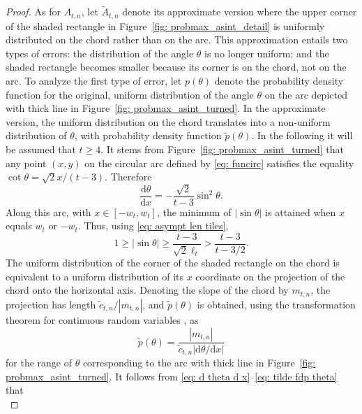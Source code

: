 \documentclass[12pt, a4paper]{article}
\newcommand{\diff}{\mathrm d}
\newcommand{\len}{\ell} %
\newcommand{\tiles}{t} %
\newcommand{\fdp}{p}
\begin{document}
\begin{proof}
As for $A_{\tiles,n}$, let $\tilde A_{\tiles,n}$ denote its approximate version where the upper corner of the shaded rectangle in Figure~\ref{fig: probmax_asint_detail} is uniformly distributed on the chord rather than on the arc. This approximation entails two types of errors: the distribution of the angle $\theta$ is no longer uniform; and the shaded rectangle becomes smaller because its corner is on the chord, not on the arc. To analyze the first type of error, let $\fdp(\theta)$ denote the probability density function for the original, uniform distribution of the angle $\theta$ on the arc depicted with thick line in Figure~\ref{fig: probmax_asint_turned}. In the approximate version, the uniform distribution on the chord translates into a non-uniform distribution of $\theta$, with probability density function $\tilde\fdp(\theta)$. In the following it will be assumed that $\tiles \geq 4$. It stems from Figure~\ref{fig: probmax_asint_turned} that any point $(x,y)$ on the circular arc defined by \eqref{eq: funcirc} satisfies the equality $\cot \theta = \sqrt{2} x /(\tiles-3)$. Therefore
\begin{equation}
\label{eq: d theta d x}
\frac{\diff \theta}{\diff x} = -\frac{\sqrt{2}}{\tiles-3} \sin^2 \theta.
\end{equation}
Along this arc, with $x \in [-w_\tiles, w_\tiles]$, the minimum of $|\sin \theta|$ is attained when $x$ equals $w_\tiles$ or $-w_\tiles$. Thus, using \eqref{eq: asympt len tiles},
\begin{equation}
\label{eq: sin theta bound}
1 \geq |\sin \theta| \geq \frac{\tiles-3}{\sqrt{2}\len_\tiles} > \frac{\tiles-3}{\tiles-3/2}.
\end{equation}
The uniform distribution of the corner of the shaded rectangle on the chord is equivalent to a uniform distribution of its $x$ coordinate on the projection of the chord onto the horizontal axis. Denoting the slope of the chord by $m_{\tiles,n}$, the projection has length $\tilde c_{\tiles,n} / |m_{\tiles,n}|$, and $\tilde\fdp(\theta)$ is obtained, using the transformation theorem for continuous random variables \cite[section~5.2]{Papoulis91}, as
\begin{equation}
\label{eq: tilde fdp theta}
\tilde \fdp(\theta) = \frac {|m_{\tiles,n}|} {\tilde c_{\tiles,n} |\diff \theta / \diff x|}
\end{equation}
for the range of $\theta$ corresponding to the arc with thick line in Figure~\ref{fig: probmax_asint_turned}. It follows from \eqref{eq: d theta d x}--\eqref{eq: tilde fdp theta} that
\begin{equation}

\end{equation}
\end{proof}
\end{document}
